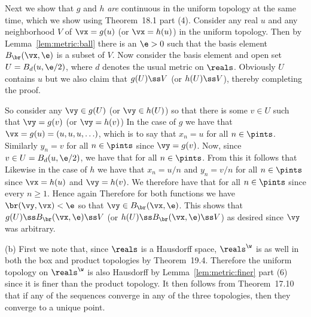 {{    Next we show that $g$ and $h$ \emph{are} continuous in the uniform topology at the same time, which we show using Theorem~18.1 part (4).
    Consider any real $u$ and any neighborhood $V$ of $\vx = g(u)$ (or $\vx = h(u)$) in the uniform topology.
    Then by Lemma~\ref{lem:metric:ball} there is an $\e > 0$ such that the basis element $B_{\br}(\vx, \e)$ is a subset of $V$.
    Now consider the basis element and open set $U = B_d(u, \e/2)$, where $d$ denotes the usual metric on $\reals$.
    Obviously $U$ contains $u$ but we also claim that $g(U) \ss V$ (or $h(U) \ss V$), thereby completing the proof.

    So consider any $\vy \in g(U)$ (or $\vy \in h(U)$) so that there is some $v \in U$ such that $\vy = g(v)$ (or $\vy = h(v)$)
    In the case of $g$ we have that $\vx = g(u) = (u,u,u,\ldots)$, which is to say that $x_n = u$ for all $n \in \pints$.
    Similarly $y_n = v$ for all $n \in \pints$ since $\vy = g(v)$.
    Now, since $v \in U = B_d(u,\e/2)$, we have that
    for all $n \in \pints$.
    From this it follows that
    Likewise in the case of $h$ we have that $x_n = u/n$ and $y_n = v/n$ for all $n \in \pints$ since $\vx = h(u)$ and $\vy = h(v)$.
    We therefore have that
    for all $n \in \pints$ since every $n \geq 1$.
    Hence again
    Therefore for both functions we have $\br(\vy, \vx) < \e$ so that $\vy \in B_{\br}(\vx, \e)$.
    This shows that $g(U) \ss B_{\br}(\vx, \e) \ss V$ (or $h(U) \ss B_{\br}(\vx, \e) \ss V$) as desired since $\vy$ was arbitrary.
  }

  (b) First we note that, since $\reals$ is a Hausdorff space, $\reals^\w$ is as well in both the box and product topologies by Theorem~19.4.
  Therefore the uniform topology on $\reals^\w$ is also Hausdorff by Lemma~\ref{lem:metric:finer} part (6) since it is finer than the product topology.
  It then follows from Theorem~17.10 that if any of the sequences converge in any of the three topologies, then they converge to a unique point.

}
